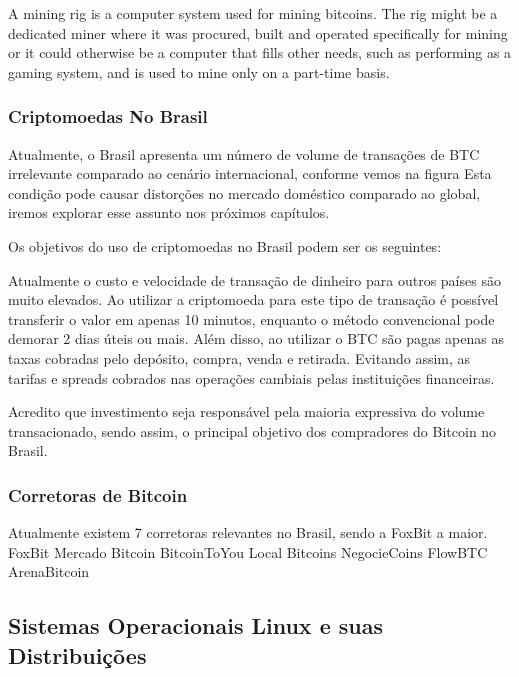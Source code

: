 \documentclass[
	article,			%
	12pt,				%
	openright,			%
	oneside,			%
	a4paper,			%
	chapter=TITLE,		%
	section=TITLE,		%
	subsection=TITLE,	%
	subsubsection=TITLE,%
	subsubsubsection=TITLE, %
	english,			%
	brazil,				%
	]{abntex2}
\begin{document}
A mining rig is a computer system used for mining bitcoins. The rig might be a dedicated miner where it was procured, built and operated specifically for mining or it could otherwise be a computer that fills other needs, such as performing as a gaming system, and is used to mine only on a part-time basis.

\cite{BitcoinWiki2015}

\subsubsection{Criptomoedas No Brasil}

Atualmente, o Brasil apresenta um número de volume de transações de BTC
irrelevante comparado ao cenário internacional, conforme vemos na figura Esta condição pode causar distorções no mercado doméstico comparado ao global, iremos explorar esse assunto nos próximos capítulos.

Os objetivos do uso de criptomoedas no Brasil podem ser os seguintes:

Atualmente o custo e velocidade de transação de dinheiro para outros países são muito elevados. Ao utilizar a criptomoeda para este tipo de transação é possível transferir o valor em apenas 10 minutos, enquanto o método convencional pode demorar 2 dias úteis ou mais. Além disso, ao utilizar o BTC são pagas apenas as taxas cobradas pelo depósito, compra, venda e retirada. Evitando assim, as tarifas e spreads cobrados nas operações cambiais pelas instituições financeiras.

\cite{Prado2017}

Acredito que investimento seja responsável pela maioria expressiva do volume transacionado, sendo assim, o principal objetivo dos compradores do Bitcoin no Brasil.

\cite{Prado2017}

\subsubsection{Corretoras de Bitcoin}

Atualmente existem 7 corretoras relevantes no Brasil, sendo a FoxBit a maior.
FoxBit Mercado Bitcoin BitcoinToYou Local Bitcoins NegocieCoins FlowBTC ArenaBitcoin

\cite{Prado2017}

\subsection{Sistemas Operacionais Linux e suas Distribuições}
\end{document}
